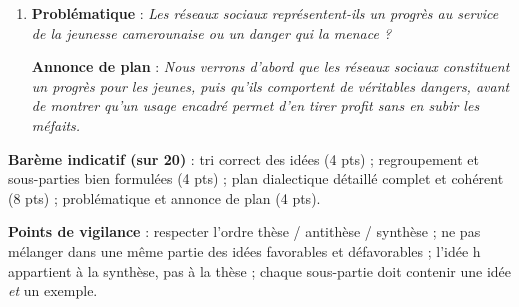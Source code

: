 \documentclass[11pt]{article}
\begin{document}
\begin{corrige}
\begin{enumerate}
\textbf{I. Les réseaux sociaux sont un progrès pour la jeunesse camerounaise (thèse).}
\begin{itemize}
\item A. Ils facilitent la communication et créent des liens (idées a, g ; ex. : échanges rapides entre élèves de Yaoundé et de Garoua, amitiés avec des jeunes d'autres pays).
\item B. Ils servent l'apprentissage et l'initiative économique (idées c, e ; ex. : cours en ligne, jeune vendeuse qui fait connaître ses produits sur les réseaux).
\end{itemize}
\textbf{II. Mais ils présentent aussi de réels dangers (antithèse).}
\begin{itemize}
\item A. Ils nuisent aux études par le temps qu'ils absorbent (idée b ; ex. : élève qui passe ses nuits en ligne et échoue en classe).
\item B. Ils exposent aux fausses informations, aux mauvaises rencontres et au harcèlement (idées d, f ; ex. : rumeurs, moqueries entre élèves).
\end{itemize}
\textbf{III. Un usage encadré et modéré permet de concilier avantages et prudence (synthèse).}
\begin{itemize}
\item A. Les jeunes doivent limiter le temps passé en ligne et vérifier les informations (idée h).
\item B. Parents et école doivent éduquer à un usage responsable (ex. : règles d'utilisation fixées en famille et au lycée).
\end{itemize}
\item \textbf{Problématique} : \emph{Les réseaux sociaux représentent-ils un progrès au service de la jeunesse camerounaise ou un danger qui la menace ?}

\textbf{Annonce de plan} : \emph{Nous verrons d'abord que les réseaux sociaux constituent un progrès pour les jeunes, puis qu'ils comportent de véritables dangers, avant de montrer qu'un usage encadré permet d'en tirer profit sans en subir les méfaits.}
\end{enumerate}

\textbf{Barème indicatif (sur 20)} : tri correct des idées (4 pts) ; regroupement et sous-parties bien formulées (4 pts) ; plan dialectique détaillé complet et cohérent (8 pts) ; problématique et annonce de plan (4 pts).

\textbf{Points de vigilance} : respecter l'ordre thèse / antithèse / synthèse ; ne pas mélanger dans une même partie des idées favorables et défavorables ; l'idée h appartient à la synthèse, pas à la thèse ; chaque sous-partie doit contenir une idée \emph{et} un exemple.
\end{corrige}
\end{document}
